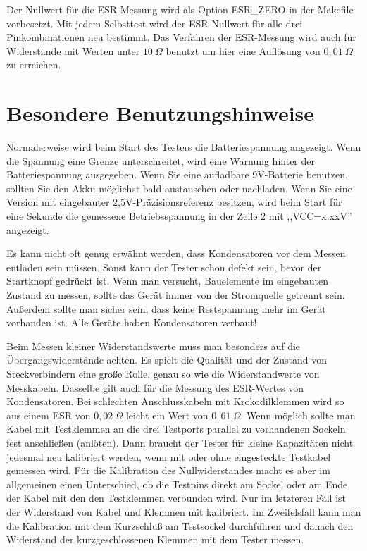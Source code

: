 Der Nullwert für die ESR-Messung wird als Option ESR\_ZERO in der Makefile vorbesetzt.
Mit jedem Selbsttest wird der ESR Nullwert für alle drei Pinkombinationen neu bestimmt.
Das Verfahren der ESR-Messung wird auch für Widerstände mit Werten unter \(10~\Omega\) benutzt um
hier eine Auflösung von \(0,01~\Omega\) zu erreichen.

\section{Besondere Benutzungshinweise}
Normalerweise wird beim Start des Testers die Batteriespannung angezeigt. Wenn die Spannung eine Grenze unterschreitet, 
wird eine Warnung hinter der Batteriespannung ausgegeben. Wenn Sie eine aufladbare 9V-Batterie benutzen, sollten Sie
den Akku möglichst bald austauschen oder nachladen.
Wenn Sie eine Version mit eingebauter 2,5V-Präzisionsreferenz besitzen, wird beim Start für eine Sekunde die
gemessene Betriebsspannung in der Zeile 2 mit ,,VCC=x.xxV'' angezeigt.

Es kann nicht oft genug erwähnt werden, dass Kondensatoren vor dem Messen entladen sein müssen.
Sonst kann der Tester schon defekt sein, bevor der Startknopf gedrückt ist.
Wenn man versucht, Bauelemente im eingebauten Zustand zu messen, sollte das Gerät immer von
der Stromquelle getrennt sein. Außerdem sollte man sicher sein, dass keine Restspannung mehr
im Gerät vorhanden ist. Alle Geräte haben Kondensatoren verbaut!

Beim Messen kleiner Widerstandswerte muss man besonders auf die Übergangswiderstände achten.
Es spielt die Qualität und der Zustand von Steckverbindern eine große Rolle, genau so wie die
Widerstandwerte von Messkabeln. Dasselbe gilt auch für die Messung des ESR-Wertes von Kondensatoren.
Bei schlechten Anschlusskabeln mit Krokodilklemmen wird so aus einem ESR von \(0,02~\Omega\) leicht
ein Wert von \(0,61~\Omega\).
Wenn möglich sollte man Kabel mit Testklemmen an die drei Testports parallel zu vorhandenen Sockeln fest anschließen (anlöten).
Dann braucht der Tester für kleine Kapazitäten nicht jedesmal neu kalibriert werden, wenn mit oder ohne eingesteckte
Testkabel gemessen wird. Für die Kalibration des Nullwiderstandes macht es aber im allgemeinen einen Unterschied, 
ob die Testpins direkt am Sockel oder am Ende der Kabel mit den den Testklemmen verbunden wird. Nur im letzteren
Fall ist der Widerstand von Kabel und Klemmen mit kalibriert. Im Zweifelsfall kann man die Kalibration mit dem
Kurzschluß am Testsockel durchführen und danach den Widerstand der kurzgeschlossenen Klemmen mit dem Tester messen.

